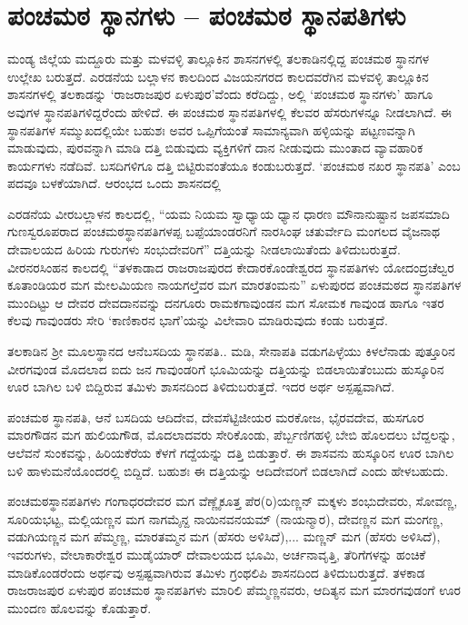 \section{ಪಂಚಮಠ ಸ್ಥಾನಗಳು – ಪಂಚಮಠ ಸ್ಥಾನಪತಿಗಳು}

ಮಂಡ್ಯ ಜಿಲ್ಲೆಯ ಮದ್ದೂರು ಮತ್ತು ಮಳವಳ್ಳಿ ತಾಲ್ಲೂಕಿನ ಶಾಸನಗಳಲ್ಲಿ ತಲಕಾಡಿನಲ್ಲಿದ್ದ ಪಂಚಮಠ ಸ್ಥಾನಗಳ ಉಲ್ಲೇಖ ಬರುತ್ತದೆ. ಎರಡನೆಯ ಬಲ್ಲಾಳನ ಕಾಲದಿಂದ ವಿಜಯನಗರದ ಕಾಲದವರೆಗಿನ ಮಳವಳ್ಳಿ ತಾಲ್ಲೂಕಿನ ಶಾಸನಗಳಲ್ಲಿ ತಲಕಾಡನ್ನು ‘ರಾಜರಾಜಪುರ ಏಳುಪುರ’ವೆಂದು ಕರೆದಿದ್ದು, ಅಲ್ಲಿ ‘ಪಂಚಮಠ ಸ್ಥಾನಗಳು’ ಹಾಗೂ ಅವುಗಳ ಸ್ಥಾನಪತಿಗಳಿದ್ದರೆಂದು ಹೇಳಿದೆ. ಈ ಪಂಚಮಠ ಸ್ಥಾನಪತಿಗಳಲ್ಲಿ ಕೆಲವರ ಹೆಸರುಗಳನ್ನೂ ನೀಡಲಾಗಿದೆ. ಈ ಸ್ಥಾನಪತಿಗಳ ಸಮ್ಮುಖದಲ್ಲಿಯೇ ಬಹುಶಃ ಅವರ ಒಪ್ಪಿಗೆಯಂತೆ ಸಾಮಾನ್ಯವಾಗಿ ಹಳ್ಳಿಯನ್ನು ಪಟ್ಟಣವನ್ನಾಗಿ ಮಾಡುವುದು, ಪುರವನ್ನಾಗಿ ಮಾಡಿ ದತ್ತಿ ಬಿಡುವುದು ವ್ಯಕ್ತಿಗಳಿಗೆ ದಾನ ನೀಡುವುದು ಮುಂತಾದ ವ್ಯಾವಹಾರಿಕ ಕಾರ್ಯಗಳು ನಡೆದಿವೆ. ಬಸದಿಗಳಿಗೂ ದತ್ತಿ ಬಿಟ್ಟಿರುವಂತೆಯೂ ಕಂಡುಬರುತ್ತದೆ. ‘ಪಂಚಮಠ ನಖರ ಸ್ಥಾನಪತಿ’ ಎಂಬ ಪದವೂ ಬಳಕೆಯಾಗಿದೆ. ಆರಂಭದ ಒಂದು ಶಾಸನದಲ್ಲಿ

ಎರಡನೆಯ ವೀರಬಲ್ಲಾಳನ ಕಾಲದಲ್ಲಿ, “ಯಮ ನಿಯಮ ಸ್ವಾಧ್ಯಾಯ ಧ್ಯಾನ ಧಾರಣ ಮೌನಾನುಷ್ಟಾನ ಜಪಸಮಾದಿ ಗುಣಸ್ವರೂಪರಾದ ಪಂಚಮಠಸ್ಥಾನಪತಿಗಳಪ್ಪ ಬಪ್ಪೆಯಾಂಡರನಿಗೆ ನಾರಸಿಂಘ ಚತುರ್ವೇದಿ ಮಂಗಲದ ವೈಜನಾಥ ದೇವಾಲಯದ ಹಿರಿಯ ಗುರುಗಳು ಸಂಭುದೇವರಿಗೆ” ದತ್ತಿಯನ್ನು ನೀಡಲಾಯಿತೆಂದು ತಿಳಿದುಬರುತ್ತದೆ. ವೀರನರಸಿಂಹನ ಕಾಲದಲ್ಲಿ “ತಳಕಾಡಾದ ರಾಜರಾಜಪುರದ ಕೇದಾರಕೊಂಡೇಶ್ವರದ ಸ್ಥಾನಪತಿಗಳು ಯೋದಂದ್ರಚೆಲ್ವರ ಕೂತಾಂಡಿಯರ ಮಗ ಮೇಲಮಿಯಣ ನಾಯಗಲ್ತೆವರ ಮಗ ಮಾರತಂಮನು” ಏಳುಪುರದ ಪಂಚಮಠದ ಸ್ಥಾನಪತಿಗಳ ಮುಂದಿಟ್ಟು ಆ ದೇವರ ದೇವದಾನವನ್ನು ದನಗೂರು ರಾಮಕಗಾವುಂಡನ ಮಗ ಸೋಮಕ ಗಾವುಂಡ ಹಾಗೂ ಇತರ ಕೆಲವು ಗಾವುಂಡರು ಸೇರಿ ‘ಕಾಣಿಕಾರನ ಭಾಗೆ’ಯನ್ನು ವಿಲೇವಾರಿ ಮಾಡಿರುವುದು ಕಂಡು ಬರುತ್ತದೆ.

ತಲಕಾಡಿನ ಶ‍್ರೀ ಮೂಲಸ್ಥಾನದ ಆನೆಬಸದಿಯ ಸ್ಥಾನಪತಿ.. ಮಡಿ, ಸೇನಾಪತಿ ವಡುಗಪಿಳ್ಳೆಯು ಕಿಳಲೆನಾಡು ಪುತ್ತೂರಿನ ವೀರಗವುಂಡ ಮೊದಲಾದ ಐದು ಜನ ಗಾವುಂಡರಿಗೆ ಭೂಮಿಯನ್ನು ದತ್ತಿಯನ್ನು ಬಿಡಲಾಯಿತೆಂಬುದು ಹುಸ್ಕೂರಿನ ಊರ ಬಾಗಿಲ ಬಳಿ ಬಿದ್ದಿರುವ ತಮಿಳು ಶಾಸನದಿಂದ ತಿಳಿದುಬರುತ್ತದೆ. ಇದರ ಅರ್ಥ ಅಸ್ಪಷ್ಟವಾಗಿದೆ.

ಪಂಚಮಠ ಸ್ಥಾನಪತಿ, ಆನೆ ಬಸದಿಯ ಆದಿದೇವ, ದೇವಸೆಟ್ಟಿಜೀಯರ ಮರಕೋಜ, ಭೈರವದೇವ, ಹುಸಗೂರ ಮಾರಗೌಡನ ಮಗ ಹುಲಿಯಗೌಡ, ಮೊದಲಾದವರು ಸೇರಿಕೊಂಡು, ಪೆರ್ಬ್ಬಣಿಗಹಳ್ಳಿ ಬೇಬಿ ಹೊಲದಲು ಬೆದ್ದಲನ್ನು, ಆಲೆವನೆ ಸುಂಕವನ್ನು, ಹಿರಿಯಕೆರೆಯ ಕೆಳಗೆ ಗದ್ದೆಯನ್ನು ದತ್ತಿ ಬಿಡುತ್ತಾರೆ. ಈ ಶಾಸವನು ಹುಸ್ಕೂರಿನ ಊರ ಬಾಗಿಲ ಬಳಿ ಹಾಳುಮನೆಯೊಂದರಲ್ಲಿ ಬಿದ್ದಿದೆ. ಬಹುಶಃ ಈ ದತ್ತಿಯನ್ನು ಆದಿದೇವರಿಗೆ ಬಿಡಲಾಗಿದೆ ಎಂದು ಹೇಳಬಹುದು.

ಪಂಚಮಠಸ್ಥಾನಪತಿಗಳು ಗಂಗಾಧರದೇವರ ಮಗ ವೆಣ್ಣೈಕೂತ್ತ ಪೆರ(ರಿ)ಯಣ್ಣನ್​ ಮಕ್ಕಳು ಶಂಭುದೇವರು, ಸೋವಣ್ಣ, ಸೂರಿಯಭಟ್ಟ, ಮಲ್ಲಿಯಣ್ಣನ ಮಗ ನಾಗಮೈನ್ದ ನಾಯಿನವನಯಮ್ (ನಾಯನ್ಮಾರ), ದೇವಣ್ಣನ ಮಗ ಮಂಗಣ್ಣ, ವಡುಗಿಯಣ್ಣನ ಮಗ ಪೆಮ್ಮಣ್ಣ, ಮಾರತಮ್ಮನ ಮಗ (ಹೆಸರು ಅಳಿಸಿದೆ),... ಮಣ್ಣನ್​ ಮಗ (ಹೆಸರು ಅಳಿಸಿದೆ), ಇವರುಗಳು, ವೇಲಾಕಾರೇಶ್ವರ ಮುಡೈಯಾರ್​ ದೇವಾಲಯದ ಭೂಮಿ, ಅರ್ಚನಾವೃತ್ತಿ, ತೆರಿಗೆಗಳನ್ನು ಹಂಚಿಕೆ ಮಾಡಿಕೊಂಡರೆಂದು ಅರ್ಥವು ಅಸ್ಪಷ್ಟವಾಗಿರುವ ತಮಿಳು ಗ್ರಂಥಲಿಪಿ ಶಾಸನದಿಂದ ತಿಳಿದುಬರುತ್ತದೆ. ತಳಕಾಡ ರಾಜರಾಜಪುರ ಏಳುಪುರ ಪಂಚಮಠ ಸ್ಥಾನಪತಿಗಳು ಮಾರಿಲಿ ಪೆಮ್ಮಣ್ಣನವರು, ಆದಿತ್ಯನ ಮಗ ಮಾರಗವುಡಂಗೆ ಊರ ಮುಂದಣ ಹೊಲವನ್ನು ಕೊಡುತ್ತಾರೆ.

